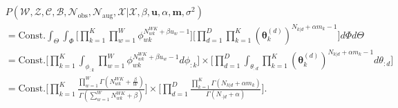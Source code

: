 \documentclass[a4paper]{article}
\begin{document}
  \begin{equation}
  \begin{aligned}
  &P(\mathcal{W}, \mathcal{Z}, \mathcal{C}, \mathcal{B}, \mathcal{N}_{\mbox{obs}}, \mathcal{N}_{\mbox{aug}}, \mathcal{X}| \mathcal{X}, \beta, \boldsymbol{u}, \alpha, \boldsymbol{m}, \sigma^2)\\&=\mbox{Const.}\int_{\Theta}\int_{\Phi}\Big[\prod_{k=1}^{K}\prod_{w=1}^{W}\phi_{wk}^{N^{WK}_{wk}+\beta u_w-1}\Big]\Big[\prod_{d=1}^{D}\prod_{k=1}^{K}(\boldsymbol{\theta}^{(d)}_{k})^{N_{k|d}+\alpha m_k-1}\Big]d\Phi d\Theta
  \\&=\mbox{Const.}\Big[\prod_{k=1}^{K}\int_{\phi_{:k}}\prod_{w=1}^{W}\phi_{wk}^{N^{WK}_{wk}+\beta u_w-1  }d\phi_{:k}\Big]\times\Big[\prod_{d=1}^{D}\int_{\theta_{:d}}\prod_{k=1}^{K}(\boldsymbol{\theta}^{(d)}_{k})^{N_{k|d}+\alpha m_k-1}d\theta_{:d}\Big]
  \\&=\mbox{Const.}\Big[\prod_{k=1}^{K}\frac{\prod_{w=1}^W\Gamma(N_{wk}^{WK}+\frac{\beta}{W})}{\Gamma(\sum_{w=1}^WN_{wk}^{WK}+\beta )}\Big]\times\Big[\prod_{d=1}^{D}\frac{\prod_{k=1}^K\Gamma(N_{k|d}+\alpha m_k)}{\Gamma(N_{\cdot|d}+\alpha)}\Big].
  \end{aligned}
  \end{equation}
\end{document}
